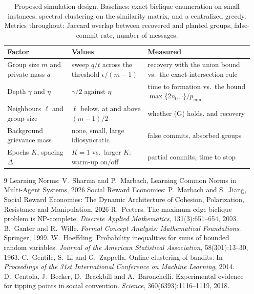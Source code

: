 \documentclass[11pt]{article}
\theoremstyle{plain}
\theoremstyle{definition}
\theoremstyle{remark}
\begin{document}
\begin{table}[h]
\centering
\small
\begin{tabular}{@{}p{3.7cm}p{6.0cm}p{5.2cm}@{}}
\toprule
\textbf{Factor} & \textbf{Values} & \textbf{Measured} \\
\midrule
Group size $m$ and private mass $q$ & sweep $q/t$ across the threshold $\epsilon/(m-1)$ & recovery with the union bound vs.\ the exact-intersection rule \\
Depth $\gamma$ and $\eta$ & $\gamma/2$ against $\eta$ & time to formation vs.\ the bound $\max\{2n_0,\cdot\}/p_{\min}$ \\
Neighbours $\ell$ and group size & $\ell$ below, at and above $(m-1)/2$ & whether (G) holds, and recovery \\
Background grievance mass & none, small, large idiosyncratic & false commits, absorbed groups \\
Epochs $K$, spacing $\Delta$ & $K=1$ vs.\ larger $K$; warm-up on/off & partial commits, time to stop \\
\bottomrule
\end{tabular}
\caption{Proposed simulation design. Baselines: exact biclique enumeration on small instances, spectral clustering on the similarity matrix, and a centralized greedy.
Metrics throughout: Jaccard overlap between recovered and planted groups, false-commit rate, number of messages.}
\label{tab:sim}
\end{table}
 
\begin{thebibliography}{9}
 {Learning Norms: V.~Sharma and P.~Marbach, Learning Common Norms in Multi-Agent Systems, 2026}
 {Social Reward Economies: P.~Marbach and S.~Jiang, Social Reward Economies: The Dynamic Architecture of Cohesion, Polarization, Resistance and Manipulation, 2026}
 R.~Peeters. The maximum edge biclique problem is NP-complete. \textit{Discrete Applied Mathematics}, 131(3):651--654, 2003.
 B.~Ganter and R.~Wille. \textit{Formal Concept Analysis: Mathematical Foundations}. Springer, 1999.
 W.~Hoeffding. Probability inequalities for sums of bounded random variables. \textit{Journal of the American Statistical Association}, 58(301):13--30, 1963.
 C.~Gentile, S.~Li and G.~Zappella. Online clustering of bandits. In \textit{Proceedings of the 31st International Conference on Machine Learning}, 2014.
 D.~Centola, J.~Becker, D.~Brackbill and A.~Baronchelli. Experimental evidence for tipping points in social convention. \textit{Science}, 360(6393):1116--1119, 2018.
\end{thebibliography}
 
\end{document}
